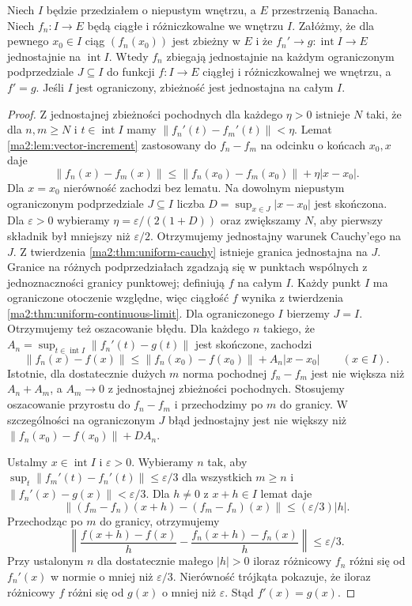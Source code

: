 \begin{twierdzenie}
\label{ma2:thm:uniform-derivative}
Niech $I$ będzie przedziałem o niepustym wnętrzu,
a $E$ przestrzenią Banacha. Niech $f_n:I\to E$
będą ciągłe i różniczkowalne we wnętrzu $I$.
Załóżmy, że dla pewnego $x_0\in I$
ciąg $(f_n(x_0))$ jest zbieżny w $E$ i że
$f_n'\to g:\operatorname{int}I\to E$ jednostajnie
na $\operatorname{int}I$.
Wtedy $f_n$ zbiegają jednostajnie na każdym
ograniczonym podprzedziale $J\subseteq I$ do funkcji
$f:I\to E$ ciągłej i różniczkowalnej we wnętrzu,
a $f'=g$. Jeśli $I$ jest ograniczony, zbieżność
jest jednostajna na całym $I$.
\end{twierdzenie}
\begin{proof}
Z jednostajnej zbieżności pochodnych dla każdego
$\eta>0$ istnieje $N$ taki, że dla $n,m\ge N$
i $t\in\operatorname{int}I$ mamy
$\|f_n'(t)-f_m'(t)\|<\eta$.
Lemat \ref{ma2:lem:vector-increment} zastosowany
do $f_n-f_m$ na odcinku o końcach $x_0,x$
daje
\[
 \|f_n(x)-f_m(x)\|
 \le\|f_n(x_0)-f_m(x_0)\|+\eta|x-x_0|.
\]
Dla $x=x_0$ nierówność zachodzi bez lematu.
Na dowolnym niepustym ograniczonym
podprzedziale $J\subseteq I$ liczba $D=\sup_{x\in J}|x-x_0|$ jest skończona.
Dla $\varepsilon>0$ wybieramy
$\eta=\varepsilon/(2(1+D))$ oraz zwiększamy
$N$, aby pierwszy składnik był mniejszy niż
$\varepsilon/2$. Otrzymujemy jednostajny
warunek Cauchy'ego na $J$.
Z twierdzenia \ref{ma2:thm:uniform-cauchy}
istnieje granica jednostajna na $J$.
Granice na różnych podprzedziałach zgadzają się
w punktach wspólnych z jednoznaczności granicy
punktowej; definiują $f$ na całym $I$.
Każdy punkt $I$ ma ograniczone otoczenie względne,
więc ciągłość $f$ wynika z twierdzenia
\ref{ma2:thm:uniform-continuous-limit}.
Dla ograniczonego $I$ bierzemy $J=I$.
Otrzymujemy też oszacowanie błędu. Dla każdego
$n$ takiego, że
$A_n=\sup_{t\in\operatorname{int}I}\|f_n'(t)-g(t)\|$
jest skończone, zachodzi
\[
 \|f_n(x)-f(x)\|
 \le\|f_n(x_0)-f(x_0)\|+A_n|x-x_0|
 \qquad(x\in I).
\]
Istotnie, dla dostatecznie dużych $m$ norma
pochodnej $f_n-f_m$ jest nie większa niż
$A_n+A_m$, a $A_m\to0$ z jednostajnej
zbieżności pochodnych. Stosujemy oszacowanie
przyrostu do $f_n-f_m$ i przechodzimy po $m$
do granicy. W szczególności na ograniczonym
$J$ błąd jednostajny jest nie większy niż
$\|f_n(x_0)-f(x_0)\|+DA_n$.

Ustalmy $x\in\operatorname{int}I$ i $\varepsilon>0$.
Wybieramy $n$ tak, aby
$\sup_t\|f_m'(t)-f_n'(t)\|\le\varepsilon/3$
dla wszystkich $m\ge n$ i
$\|f_n'(x)-g(x)\|<\varepsilon/3$.
Dla $h\ne0$ z $x+h\in I$ lemat daje
\[
 \|(f_m-f_n)(x+h)-(f_m-f_n)(x)\|
 \le(\varepsilon/3)|h|.
\]
Przechodząc po $m$ do granicy, otrzymujemy
\[
 \left\|\frac{f(x+h)-f(x)}h-
             \frac{f_n(x+h)-f_n(x)}h\right\|
 \le\varepsilon/3.
\]
Przy ustalonym $n$ dla dostatecznie małego
$|h|>0$ iloraz różnicowy $f_n$ różni się
od $f_n'(x)$ w normie o mniej niż $\varepsilon/3$.
Nierówność trójkąta pokazuje, że iloraz
różnicowy $f$ różni się od $g(x)$ o mniej niż
$\varepsilon$. Stąd $f'(x)=g(x)$.
\end{proof}
